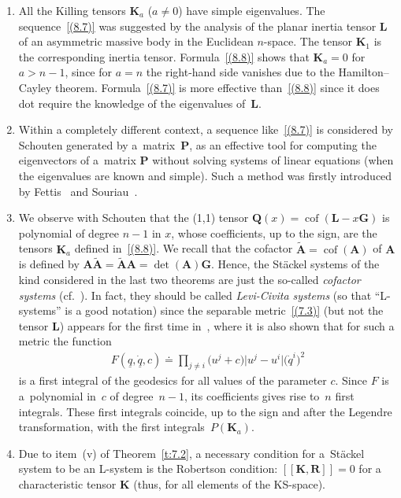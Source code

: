 \documentclass[pdftex]{sigma}
\def\bs{\boldsymbol}
\numberwithin{equation}{section}
\begin{document}
\begin{Remarks}\quad
\begin{enumerate}\itemsep=0pt
\item[(i)] All the Killing tensors $\bs K_a$ ($a\neq 0$) have simple eigenvalues. The sequence~\eqref{(8.7)} was suggested by the analysis \cite{Benenti-1992b} of the planar inertia tensor $\bs L$ of an asymmetric massive body in the Euclidean $n$-space. The tensor $\bs K_1$ is the corresponding inertia tensor.
Formula~\eqref{(8.8)} shows that $\bs K_a=0$ for $a>n-1$, since for $a=n$ the right-hand side vanishes due to the Hamilton--Cayley theorem. Formula~\eqref{(8.7)} is more ef\/fective than~\eqref{(8.8)} since it does dot require the knowledge of the eigenvalues of~$\bs L$.

\item[(ii)] Within  a completely dif\/ferent context, a sequence like~\eqref{(8.7)} is considered by Schouten  \cite[p.~30]{Schouten-1954} generated by a~matrix~$\bs P$, as an ef\/fective tool for computing the eigenvectors of a~matrix $\bs P$ without solving systems of linear equations (when the eigenvalues are known and simple). Such a method was f\/irstly introduced by Fettis~\cite{Fettis-1950} and Souriau~\cite{Souriau-1950}.

\item[(iii)] We observe with Schouten \cite{Schouten-1954} that the (1,1) tensor $\bs Q(x)=\operatorname{cof}(\bs L-x\bs G)$ is polynomial of degree $n-1$ in $x$, whose coef\/f\/icients, up to the sign, are the tensors $\bs K_a$ def\/ined in~\eqref{(8.8)}. We recall that the cofactor $\tilde{\bs A}=\operatorname{cof}(\bs A)$ of $\bs A$ is def\/ined by $\bs A\tilde{\bs A}=\tilde{\bs A}\bs A=\det(\bs A)\bs G$. Hence, the St\"ackel systems of the kind considered in the last two theorems are just the so-called {\it cofactor systems} (cf.~\cite{Blaszak-Ma-2003}).
In fact, they should be called {\it Levi-Civita systems} (so that ``L-systems'' is a good notation) since the separable metric~\eqref{(7.3)} (but not the tensor $\bs L$) appears for the f\/irst time in~\cite{LC-1896}, where it is also shown that for such a metric the function
\begin{gather*}
F(\underline q,\underline{\dot q},c)\doteq  \prod_{j\neq i} \big(u^j+c\big) \big|u^j-u^i\big| \big(\dot q^i\big)^2
\end{gather*}
is a f\/irst integral of the geodesics for all values of the parameter $c$. Since $F$ is a~polynomial in~$c$ of degree~$n-1$, its coef\/f\/icients gives rise to~$n$ f\/irst integrals. These f\/irst integrals coincide, up to the sign and after the Legendre transformation, with the f\/irst integ\-rals~$P(\bs K_a)$.

\item[(iv)] Due to item~(v) of Theorem~\ref{t:7.2}, a necessary condition for a~St\"ackel system to be an L-system is the Robertson condition: $[\! [\bs K,\bs R]\! ]=0$ for a characteristic tensor $\bs K$ (thus, for all elements of the KS-space).
 \end{enumerate}
 \end{Remarks}
\end{document}

